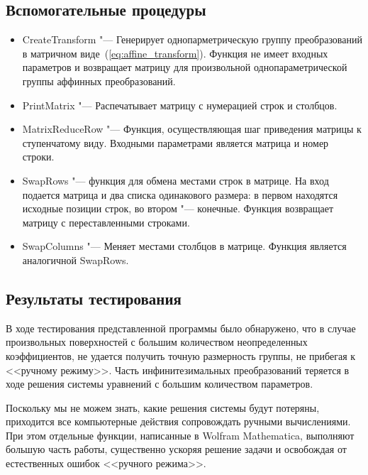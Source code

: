 \documentclass[../main.tex]{subfiles}
\begin{document}
\subsection{Вспомогательные процедуры}
\begin{itemize}
\item {\ttfamily CreateTransform} "--- Генерирует однопарметрическую группу преобразований в матричном виде~(\ref{eq:affine_transform}). Функция не имеет входных параметров и возвращает матрицу для произвольной однопараметрической группы аффинных преобразований.

\item {\ttfamily PrintMatrix} "--- Распечатывает матрицу с нумерацией строк и столбцов.

\item {\ttfamily MatrixReduceRow} "--- Функция, осуществляющая шаг приведения матрицы к ступенчатому виду. Входными параметрами является матрица и номер строки.

\item {\ttfamily SwapRows} "--- функция для обмена местами строк в матрице. На вход подается матрица и два списка одинакового размера: в первом находятся исходные позиции строк, во втором "--- конечные. Функция возвращает матрицу с переставленными строками.

\item {\ttfamily SwapColumns} "--- Меняет местами столбцов в матрице. Функция является аналогичной {\ttfamily SwapRows}.

\end{itemize}

\subsection{Результаты тестирования}
В ходе тестирования представленной программы было обнаружено, что в случае произвольных поверхностей с большим количеством неопределенных коэффициентов, не удается получить точную размерность группы, не прибегая к <<ручному режиму>>. Часть инфинитезимальных преобразований теряется в ходе решения системы уравнений с большим количеством параметров.

Поскольку мы не можем знать, какие решения системы будут потеряны, приходится все компьютерные действия сопровождать ручными вычислениями. При этом отдельные функции, написанные в {\ttfamily Wolfram Mathematica}, выполняют большую часть работы, существенно ускоряя решение задачи и освобождая от естественных ошибок <<ручного режима>>.
\end{document}
